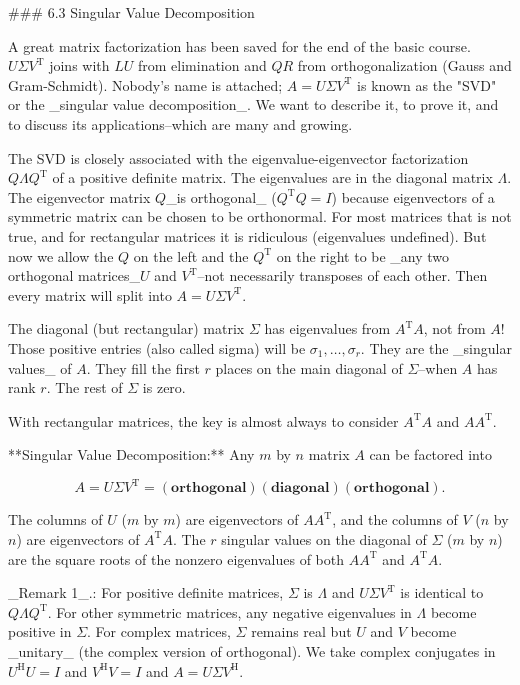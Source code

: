 

### 6.3 Singular Value Decomposition

A great matrix factorization has been saved for the end of the basic course. \(U\Sigma V^{\mathrm{T}}\) joins with \(LU\) from elimination and \(QR\) from orthogonalization (Gauss and Gram-Schmidt). Nobody's name is attached; \(A=U\Sigma V^{\mathrm{T}}\) is known as the "SVD" or the _singular value decomposition_. We want to describe it, to prove it, and to discuss its applications--which are many and growing.

The SVD is closely associated with the eigenvalue-eigenvector factorization \(Q\Lambda Q^{\mathrm{T}}\) of a positive definite matrix. The eigenvalues are in the diagonal matrix \(\Lambda\). The eigenvector matrix \(Q\)_is orthogonal_ (\(Q^{\mathrm{T}}Q=I\)) because eigenvectors of a symmetric matrix can be chosen to be orthonormal. For most matrices that is not true, and for rectangular matrices it is ridiculous (eigenvalues undefined). But now we allow the \(Q\) on the left and the \(Q^{\mathrm{T}}\) on the right to be _any two orthogonal matrices_\(U\) and \(V^{\mathrm{T}}\)--not necessarily transposes of each other. Then every matrix will split into \(A=U\Sigma V^{\mathrm{T}}\).

The diagonal (but rectangular) matrix \(\Sigma\) has eigenvalues from \(A^{\mathrm{T}}A\), not from \(A\)! Those positive entries (also called sigma) will be \(\sigma_{1},\ldots,\sigma_{r}\). They are the _singular values_ of \(A\). They fill the first \(r\) places on the main diagonal of \(\Sigma\)--when \(A\) has rank \(r\). The rest of \(\Sigma\) is zero.

With rectangular matrices, the key is almost always to consider \(A^{\mathrm{T}}A\) and \(AA^{\mathrm{T}}\).

**Singular Value Decomposition:** Any \(m\) by \(n\) matrix \(A\) can be factored into

\[A=U\Sigma V^{\mathrm{T}}=(\mathbf{orthogonal})(\mathbf{diagonal})(\mathbf{orthogonal }).\]

The columns of \(U\) (\(m\) by \(m\)) are eigenvectors of \(AA^{\mathrm{T}}\), and the columns of \(V\) (\(n\) by \(n\)) are eigenvectors of \(A^{\mathrm{T}}A\). The \(r\) singular values on the diagonal of \(\Sigma\) (\(m\) by \(n\)) are the square roots of the nonzero eigenvalues of both \(AA^{\mathrm{T}}\) and \(A^{\mathrm{T}}A\).

_Remark 1_.: For positive definite matrices, \(\Sigma\) is \(\Lambda\) and \(U\Sigma V^{\mathrm{T}}\) is identical to \(Q\Lambda Q^{\mathrm{T}}\). For other symmetric matrices, any negative eigenvalues in \(\Lambda\) become positive in \(\Sigma\). For complex matrices, \(\Sigma\) remains real but \(U\) and \(V\) become _unitary_ (the complex version of orthogonal). We take complex conjugates in \(U^{\mathrm{H}}U=I\) and \(V^{\mathrm{H}}V=I\) and \(A=U\Sigma V^{\mathrm{H}}\).

